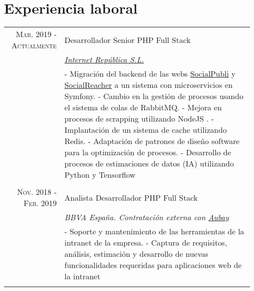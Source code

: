 \documentclass[a4paper,10pt]{article}
\begin{document}
\section{Experiencia laboral}
\begin{tabular}{r|p{11cm}}
 	\textsc{Mar. 2019 - Actualmente}&		Desarrollador Senior PHP Full Stack \\&
	\emph{\href{https://internetrepublica.com/}{Internet República S.L.}}\\&
 	\footnotesize{
 		- Migración del backend de las webs \href{http://socialpubli.com}{SocialPubli} y \href{http://socialreacher.com}{SocialReacher} a un sistema con microservicios en Symfony.\newline
 		- Cambio en la gestión de procesos usando el sistema de colas de RabbitMQ.\newline
 		- Mejora en procesos de scrapping utilizando NodeJS .\newline
 		- Implantación de un sistema de cache utilizando Redis.\newline
 		- Adaptación de patrones de diseño software para la optimización de procesos.\newline
 		- Desarrollo de procesos de estimaciones de datos (IA) utilizando Python y Tensorflow
    }\\
 	\multicolumn{2}{c}{} \\

 	\textsc{Nov. 2018 - Feb. 2019}&		Analista Desarrollador PHP Full Stack \\&
 	\emph{BBVA España. Contratación externa con \href{https://www.aubay.com/}{Aubay}}\\&
 	\footnotesize{
 		- Soporte y mantenimiento de las herramientas de la intranet de la empresa.\newline
		- Captura de requisitos, análisis, estimación y desarrollo de nuevas funcionalidades requeridas para aplicaciones web de la intranet
 	}\\
 	\multicolumn{2}{c}{} \\
 	


\end{tabular}
\end{document}
